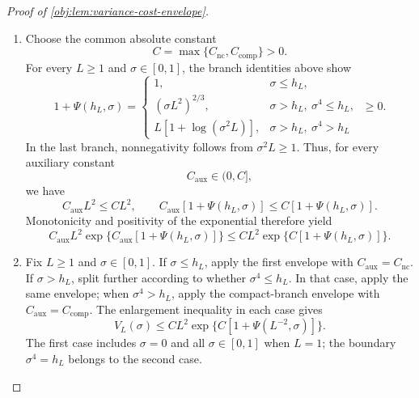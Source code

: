 \begin{proof}[Proof of \cref{obj:lem:variance-cost-envelope}]
\begin{enumerate}
\item Choose the common absolute constant
\[
C=\max\{C_{\mathrm{nc}},C_{\mathrm{comp}}\}>0.
\]
For every \(L\ge1\) and \(\sigma\in[0,1]\), the branch identities above show
\[
1+\Psi(h_L,\sigma)
=
\begin{cases}
1,&\sigma\le h_L,\\
(\sigma L^2)^{2/3},&\sigma>h_L,\ \sigma^4\le h_L,\\
L[1+\log(\sigma^2L)],&\sigma>h_L,\ \sigma^4>h_L
\end{cases}
\ \ge0.
\]
In the last branch, nonnegativity follows from \(\sigma^2L\ge1\).
Thus, for every auxiliary constant
\[
C_{\mathrm{aux}}\in(0,C],
\]
we have
\[
C_{\mathrm{aux}}L^2\le CL^2,
\qquad
C_{\mathrm{aux}}[1+\Psi(h_L,\sigma)]
\le C[1+\Psi(h_L,\sigma)].
\]
Monotonicity and positivity of the exponential therefore yield
\[
C_{\mathrm{aux}}L^2
\exp\{C_{\mathrm{aux}}[1+\Psi(h_L,\sigma)]\}
\le
CL^2\exp\{C[1+\Psi(h_L,\sigma)]\}.
\]

\item Fix \(L\ge1\) and \(\sigma\in[0,1]\). If \(\sigma\le h_L\), apply the
first envelope with \(C_{\mathrm{aux}}=C_{\mathrm{nc}}\).
If \(\sigma>h_L\), split further according to whether
\(\sigma^4\le h_L\). In that case, apply the same envelope; when
\(\sigma^4>h_L\), apply the compact-branch envelope with
\(C_{\mathrm{aux}}=C_{\mathrm{comp}}\). The enlargement inequality in each
case gives
\[
V_L(\sigma)\le CL^2
\exp\{C[1+\Psi(L^{-2},\sigma)]\}.
\]
The first case includes \(\sigma=0\) and all \(\sigma\in[0,1]\) when
\(L=1\); the boundary \(\sigma^4=h_L\) belongs to the second case.
\end{enumerate}
\end{proof}
